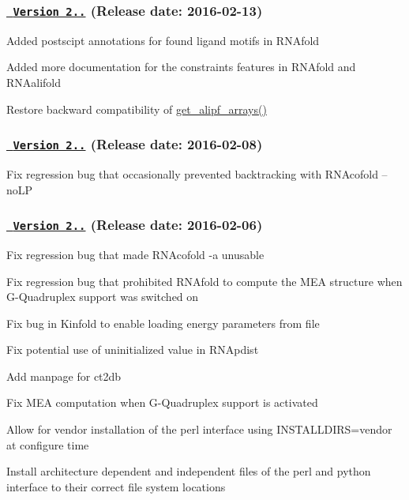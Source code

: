 \subsubsection*{\href{https://github.com/ViennaRNA/ViennaRNA/compare/v2.2.2...v2.2.3}{\texttt{ Version 2..}} (Release date\+: 2016-\/02-\/13)}


\begin{DoxyItemize}
\item Added postscipt annotations for found ligand motifs in R\+N\+Afold
\item Added more documentation for the constraints features in R\+N\+Afold and R\+N\+Aalifold
\item Restore backward compatibility of \mbox{\hyperlink{group__part__func__global__deprecated_ga5349960075b1847720a2e9df021e2675}{get\+\_\+alipf\+\_\+arrays()}}
\end{DoxyItemize}

\subsubsection*{\href{https://github.com/ViennaRNA/ViennaRNA/compare/v2.2.1...v2.2.2}{\texttt{ Version 2..}} (Release date\+: 2016-\/02-\/08)}


\begin{DoxyItemize}
\item Fix regression bug that occasionally prevented backtracking with R\+N\+Acofold --no\+LP
\end{DoxyItemize}

\subsubsection*{\href{https://github.com/ViennaRNA/ViennaRNA/compare/v2.2.0...v2.2.1}{\texttt{ Version 2..}} (Release date\+: 2016-\/02-\/06)}


\begin{DoxyItemize}
\item Fix regression bug that made R\+N\+Acofold -\/a unusable
\item Fix regression bug that prohibited R\+N\+Afold to compute the M\+EA structure when G-\/\+Quadruplex support was switched on
\item Fix bug in Kinfold to enable loading energy parameters from file
\item Fix potential use of uninitialized value in R\+N\+Apdist
\item Add manpage for ct2db
\item Fix M\+EA computation when G-\/\+Quadruplex support is activated
\item Allow for vendor installation of the perl interface using I\+N\+S\+T\+A\+L\+L\+D\+I\+RS=vendor at configure time
\item Install architecture dependent and independent files of the perl and python interface to their correct file system locations
\end{DoxyItemize}

